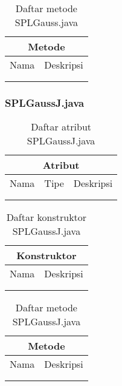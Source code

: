 \begin{table}[H]
    \centering
    \begin{tabular}{c|c}
        \hline
        \hline
        \multicolumn{2}{c}{\textbf{Metode}}\\
        \hline
        \hline
         Nama  & Deskripsi \\
         \hline 
         \hline 
         &  \\
         &  \\
    \end{tabular}
    \caption{Daftar metode SPLGauss.java}
\end{table}

\subsubsection{SPLGaussJ.java}

\begin{table}[H]
    \centering
    \begin{tabular}{c|c|c}
        \hline
        \hline
        \multicolumn{3}{c}{\textbf{Atribut}}\\
        \hline
        \hline
         Nama & Tipe & Deskripsi \\
         \hline 
         \hline 
         &  & \\
         &  & \\
    \end{tabular}
    \caption{Daftar atribut SPLGaussJ.java}
\end{table}

\begin{table}[H]
    \centering
    \begin{tabular}{c|c}
        \hline
        \hline
        \multicolumn{2}{c}{\textbf{Konstruktor}}\\
        \hline
        \hline
         Nama  & Deskripsi \\
         \hline 
         \hline 
         &  \\
         &  \\
    \end{tabular}
    \caption{Daftar konstruktor SPLGaussJ.java}
\end{table}

\begin{table}[H]
    \centering
    \begin{tabular}{c|c}
        \hline
        \hline
        \multicolumn{2}{c}{\textbf{Metode}}\\
        \hline
        \hline
         Nama  & Deskripsi \\
         \hline 
         \hline 
         &  \\
         &  \\
    \end{tabular}
    \caption{Daftar metode SPLGaussJ.java}
\end{table}

